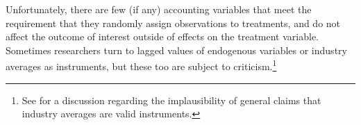\documentclass[12pt,reqno,titlepage]{amsart}
\begin{document}
\begin{doublespace}

Unfortunately, there are few (if any) accounting variables that meet the requirement that they randomly assign observations to treatments, and do not affect the outcome of interest outside of effects on the treatment variable.
Sometimes researchers turn to lagged values of endogenous variables or industry averages as instruments, but these too are subject to criticism.\footnote{
See \citet{Reiss:2007ej} for a discussion regarding the implausibility of general claims that industry averages are valid instruments.}  



\end{doublespace}
\end{document}
